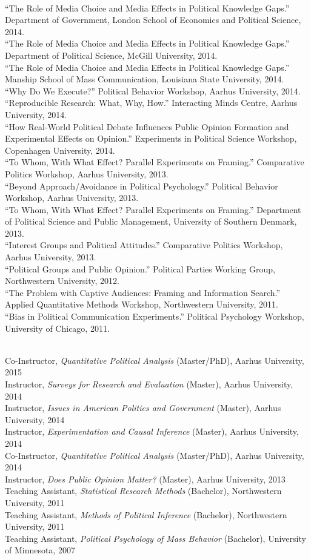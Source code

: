 \documentclass[12pt]{article}
\renewcommand{\section}[1]{\pagebreak[3]%
    \llap{\scshape\smash{\parbox[t]{\marginparwidth}{\raggedright {\color{lg}#1}}}}%
    \vspace{-\baselineskip}\par}
\newcommand{\topic}[1]{\pagebreak[3]\indent {\color{lg}{\footnotesize #1 }}\\}
\newcommand{\entry}[1]{\indent {\color{lg}\guillemotright}\hspace{2pt}#1\vspace{.25em}\\}
\begin{document}
\topic{Invited Presenations}
\entry{``The Role of Media Choice and Media Effects in Political Knowledge Gaps.'' Department of Government, London School of Economics and Political Science, 2014.}
\entry{``The Role of Media Choice and Media Effects in Political Knowledge Gaps.'' Department of Political Science, McGill University, 2014.}
\entry{``The Role of Media Choice and Media Effects in Political Knowledge Gaps.'' Manship School of Mass Communication, Louisiana State University, 2014.}
\entry{``Why Do We Execute?'' Political Behavior Workshop, Aarhus University, 2014.}
\entry{``Reproducible Research: What, Why, How.'' Interacting Minds Centre, Aarhus University, 2014.}
\entry{``How Real-World Political Debate Influences Public Opinion Formation and Experimental Effects on Opinion.'' Experiments in Political Science Workshop, Copenhagen University, 2014.}
\entry{``To Whom, With What Effect? Parallel Experiments on Framing.'' Comparative Politics Workshop, Aarhus University, 2013.}
\entry{``Beyond Approach/Avoidance in Political Psychology.'' Political Behavior Workshop, Aarhus University, 2013.}
\entry{``To Whom, With What Effect? Parallel Experiments on Framing.'' Department of Political Science and Public Management, University of Southern Denmark, 2013.}
\entry{``Interest Groups and Political Attitudes.'' Comparative Politics Workshop, Aarhus University, 2013.}
\entry{``Political Groups and Public Opinion.'' Political Parties Working Group, Northwestern University, 2012.}
\entry{``The Problem with Captive Audiences: Framing and Information Search.'' Applied Quantitative Methods Workshop, Northwestern University, 2011.}
\entry{``Bias in Political Communication Experiments.'' Political Psychology Workshop, University of Chicago, 2011.}


\section{Teaching and Advising}
\topic{Experience}
\entry{Co-Instructor, {\em Quantitative Political Analysis} (Master/PhD), Aarhus University, 2015}
\entry{Instructor, {\em Surveys for Research and Evaluation} (Master), Aarhus University, 2014}
\entry{Instructor, {\em Issues in American Politics and Government} (Master), Aarhus University, 2014}
\entry{Instructor, {\em Experimentation and Causal Inference} (Master), Aarhus University, 2014}
\entry{Co-Instructor, {\em Quantitative Political Analysis} (Master/PhD), Aarhus University, 2014}
\entry{Instructor, {\em Does Public Opinion Matter?} (Master), Aarhus University, 2013}
\entry{Teaching Assistant, {\em Statistical Research Methods} (Bachelor), Northwestern University, 2011} %
\entry{Teaching Assistant, {\em Methods of Political Inference} (Bachelor), Northwestern University, 2011} %
\entry{Teaching Assistant, {\em Political Psychology of Mass Behavior} (Bachelor), University of Minnesota, 2007} %
\end{document}
